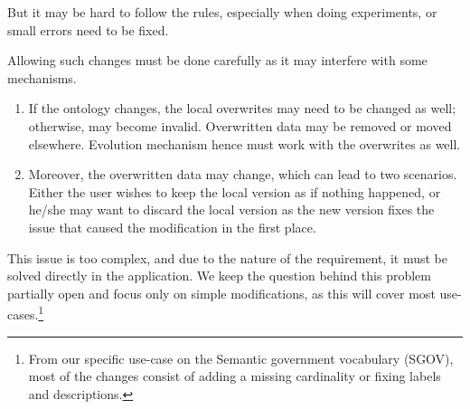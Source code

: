 But it may be hard to follow the rules, especially when doing experiments, or small errors need to be fixed.

Allowing such changes must be done carefully as it may interfere with some mechanisms.
\begin{enumerate}
  \item If the ontology changes, the local overwrites may need to be changed as well; otherwise, may become invalid. Overwritten data may be removed or moved elsewhere. Evolution mechanism hence must work with the overwrites as well.
  \item Moreover, the overwritten data may change, which can lead to two scenarios. Either the user wishes to keep the local version as if nothing happened, or he/she may want to discard the local version as the new version fixes the issue that caused the modification in the first place.
\end{enumerate}

This issue is too complex, and due to the nature of the requirement, it must be solved directly in the application. We keep the question behind this problem partially open and focus only on simple modifications, as this will cover most use-cases.\footnote{From our specific use-case on the Semantic government vocabulary (SGOV), most of the changes consist of adding a missing cardinality or fixing labels and descriptions.}